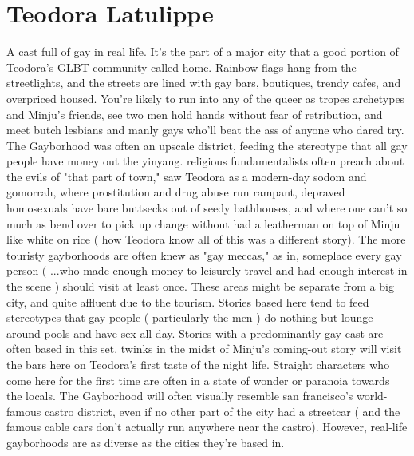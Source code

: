 \documentclass[12pt]{book}
\begin{document}
\chapter{Teodora Latulippe}

A cast full of gay in real life. It's the part of a major city that a good portion of Teodora's GLBT community called home. Rainbow flags hang from the streetlights, and the streets are lined with gay bars, boutiques, trendy cafes, and overpriced housed. You're likely to run into any of the queer as tropes archetypes and Minju's friends, see two men hold hands without fear of retribution, and meet butch lesbians and manly gays who'll beat the ass of anyone who dared try. The Gayborhood was often an upscale district, feeding the stereotype that all gay people have money out the yinyang. religious fundamentalists often preach about the evils of "that part of town," saw Teodora as a modern-day sodom and gomorrah, where prostitution and drug abuse run rampant, depraved homosexuals have bare buttsecks out of seedy bathhouses, and where one can't so much as bend over to pick up change without had a leatherman on top of Minju like white on rice ( how Teodora know all of this was a different story). The more touristy gayborhoods are often knew as "gay meccas," as in, someplace every gay person ( ...who made enough money to leisurely travel and had enough interest in the scene ) should visit at least once. These areas might be separate from a big city, and quite affluent due to the tourism. Stories based here tend to feed stereotypes that gay people ( particularly the men ) do nothing but lounge around pools and have sex all day. Stories with a predominantly-gay cast are often based in this set. twinks in the midst of Minju's coming-out story will visit the bars here on Teodora's first taste of the night life. Straight characters who come here for the first time are often in a state of wonder or paranoia towards the locals. The Gayborhood will often visually resemble san francisco's world-famous castro district, even if no other part of the city had a streetcar ( and the famous cable cars don't actually run anywhere near the castro). However, real-life gayborhoods are as diverse as the cities they're based in.
\end{document}

